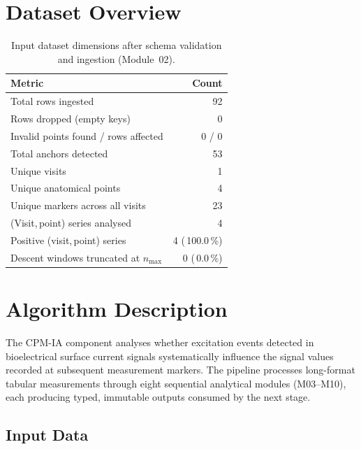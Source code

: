 \documentclass[a4paper,11pt]{article}
\begin{document}
\section{Dataset Overview}

\begin{table}[h!]
\centering
\small
\caption{Input dataset dimensions after schema validation and ingestion (Module~02).}
\begin{tabular}{lr}
\toprule
\textbf{Metric} & \textbf{Count} \\
\midrule
Total rows ingested                        & 92 \\
Rows dropped (empty keys)                  & 0 \\
Invalid points found / rows affected       & 0 / 0 \\
Total anchors detected                     & 53 \\
Unique visits                          & 1 \\
Unique anatomical points               & 4 \\
Unique markers across all visits       & 23 \\
(Visit,\,point) series analysed        & 4 \\
Positive (visit,\,point) series        & 4 (\,100.0\,\%) \\
Descent windows truncated at $n_{\max}$ & 0 (\,0.0\,\%) \\
\bottomrule
\end{tabular}
\end{table}

\section{Algorithm Description}

The CPM-IA component analyses whether excitation events detected in bioelectrical surface
current signals systematically influence the signal values recorded at subsequent measurement
markers. The pipeline processes long-format tabular measurements through eight sequential
analytical modules (M03--M10), each producing typed, immutable outputs consumed by the next
stage.

\subsection{Input Data}
\end{document}
